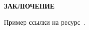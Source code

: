 \newpage
\begin{center}
  \Large{\textbf{ЗАКЛЮЧЕНИЕ}}
\end{center}

Пример ссылки на ресурс~\cite{Spero}.
\newpage
